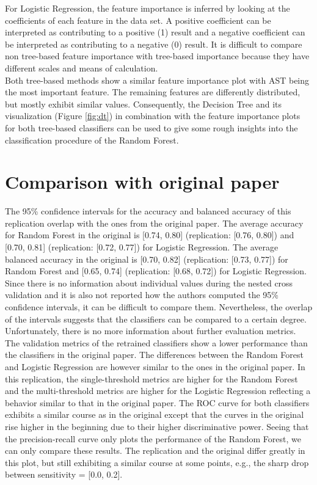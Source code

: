 For Logistic Regression, the feature importance is inferred by looking at the 
coefficients of each feature in the data set. A positive coefficient can be 
interpreted as contributing to a positive (1) result and a negative coefficient 
can be interpreted as contributing to a negative (0) result.
It is difficult to compare non tree-based feature importance with tree-based 
importance because they have different scales and means of calculation.
\\
Both tree-based methods show a similar feature importance plot with AST being 
the most important feature. The remaining features are differently distributed, 
but mostly exhibit similar values. Consequently, the Decision Tree and its 
visualization (Figure \ref{fig:dt}) in combination with the feature 
importance plots for both tree-based classifiers can be used to give some rough 
insights into the classification procedure of the Random Forest.

\section{Comparison with original paper}
The 95\% confidence intervals for the accuracy and balanced accuracy of this 
replication overlap with the ones from the original paper. The average accuracy 
for Random Forest in the original is [0.74, 0.80] (replication: [0.76, 0.80]) 
and [0.70, 0.81] (replication: [0.72, 0.77]) for Logistic Regression. The 
average balanced accuracy in the original is [0.70, 0.82] (replication: 
[0.73, 0.77]) for Random Forest and [0.65, 0.74] (replication: [0.68, 0.72]) 
for Logistic Regression. Since there is no information about individual values 
during the nested cross validation and it is also not reported how the authors 
computed the 95\% confidence intervals, it can be difficult to compare them. 
Nevertheless, the overlap of the intervals suggests that the classifiers can be 
compared to a certain degree. Unfortunately, there is no more information about 
further evaluation metrics.
\\
The validation metrics of the retrained classifiers show a lower performance 
than the classifiers in the original paper. The differences between the Random 
Forest and Logistic Regression are however similar to the ones in the original 
paper. In this replication, the single-threshold metrics are higher for the 
Random Forest and the multi-threshold metrics are higher for the Logistic 
Regression reflecting a behavior similar to that in the original paper. The 
ROC curve for both classifiers exhibits a similar course as in the original 
except that the curves in the original rise higher in the beginning due to 
their higher discriminative power. Seeing that the precision-recall curve only 
plots the performance of the Random Forest, we can only compare these results. 
The replication and the original differ greatly in this plot, but still 
exhibiting a similar course at some points, e.g., the sharp drop between 
sensitivity = [0.0, 0.2]. 
